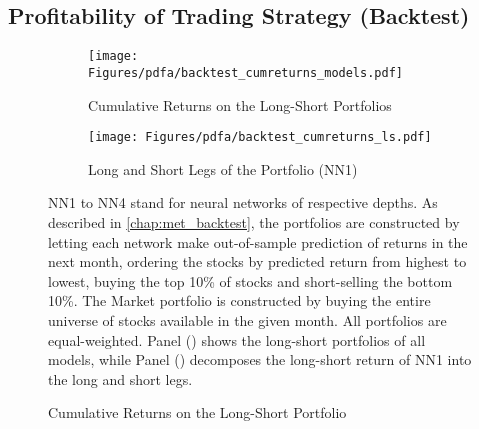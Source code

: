 	\subsection{Profitability of Trading Strategy (Backtest)}
		\label{chap:backtest}
		
		\begin{figure}	
			\centering		
			\begin{subfigure}[t]{\textwidth}
				\centering	
				\texttt{[image: Figures/pdfa/backtest\_cumreturns\_models.pdf]}
				\caption{Cumulative Returns on the Long-Short Portfolios}
				\label{fig:backtest_cumreturns_models}
			\end{subfigure}
			
			\begin{subfigure}[t]{\textwidth}
				\texttt{[image: Figures/pdfa/backtest\_cumreturns\_ls.pdf]}
				\caption{Long and Short Legs of the Portfolio (NN1)}
				\label{fig:backtest_cumreturns_ls}
			\end{subfigure}
			\caption{Cumulative Returns on the Long-Short Portfolio}
			\medskip
			\small
			NN1 to NN4 stand for neural networks of respective depths. As described in \ref{chap:met_backtest}, the portfolios are constructed by letting each network make out-of-sample prediction of returns in the next month, ordering the stocks by predicted return from highest to lowest, buying the top 10\% of stocks and short-selling the bottom 10\%. The Market portfolio is constructed by buying the entire universe of stocks available in the given month. All portfolios are equal-weighted. Panel () shows the long-short portfolios of all models, while Panel () decomposes the long-short return of NN1 into the long and short legs. 
			\label{fig:cumulative_return}
		\end{figure}     
		
